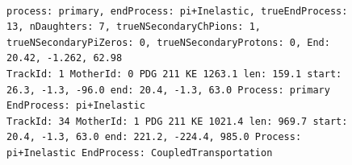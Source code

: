 \documentclass[letterpaper,12pt]{article}
\begin{document}
\begin{figure}[!hbtp]
  \begin{center}
\\
\begin{lstlisting}
process: primary, endProcess: pi+Inelastic, trueEndProcess: 13, nDaughters: 7, trueNSecondaryChPions: 1, trueNSecondaryPiZeros: 0, trueNSecondaryProtons: 0, End: 20.42, -1.262, 62.98
TrackId: 1 MotherId: 0 PDG 211 KE 1263.1 len: 159.1 start: 26.3, -1.3, -96.0 end: 20.4, -1.3, 63.0 Process: primary EndProcess: pi+Inelastic
TrackId: 34 MotherId: 1 PDG 211 KE 1021.4 len: 969.7 start: 20.4, -1.3, 63.0 end: 221.2, -224.4, 985.0 Process: pi+Inelastic EndProcess: CoupledTransportation

\end{lstlisting}
\end{center}
\end{figure}
\end{document}
